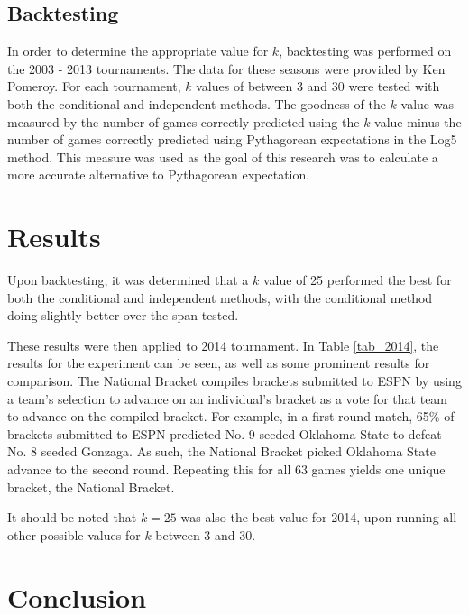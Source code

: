 \documentclass[5p, preprint]{elsarticle}
\begin{document}
\vspace*{-.1in}

\subsection*{Backtesting}

In order to determine the appropriate value for $k$, backtesting was performed on the 2003 - 2013 tournaments. The data for these seasons were provided by Ken Pomeroy. For each tournament, $k$ values of between 3 and 30 were tested with both the conditional and independent methods. The goodness of the $k$ value was measured by the number of games correctly predicted using the $k$ value minus the number of games correctly predicted using Pythagorean expectations in the Log5 method. This measure was used as the goal of this research was to calculate a more accurate alternative to Pythagorean expectation. 

\vspace*{-.1in}

\section{Results}

Upon backtesting, it was determined that a $k$ value of 25 performed the best for both the conditional and independent methods, with the conditional method doing slightly better over the span tested.

These results were then applied to 2014 tournament. In Table \ref{tab_2014}, the results for the experiment can be seen, as well as some prominent results for comparison. The National Bracket compiles brackets submitted to ESPN by using a team's selection to advance on an individual's bracket as a vote for that team to advance on the compiled bracket. For example, in a first-round match, 65\% of brackets submitted to ESPN predicted No. 9 seeded Oklahoma State to defeat No. 8 seeded Gonzaga. As such, the National Bracket picked Oklahoma State advance to the second round. Repeating this for all 63 games yields one unique bracket, the National Bracket. 

It should be noted that $k=25$ was also the best value for 2014, upon running all other possible values for $k$ between 3 and 30.

\vspace*{-.1in}

\section{Conclusion}
\end{document}
